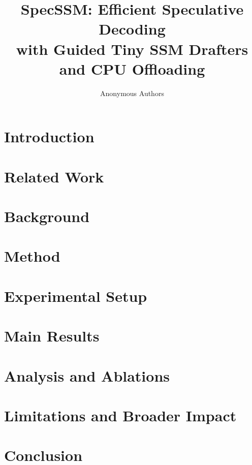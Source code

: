 \documentclass{article}
\title{SpecSSM: Efficient Speculative Decoding\\with Guided Tiny SSM Drafters and CPU Offloading}
\author{Anonymous Authors}
\begin{document}
\maketitle

\begin{abstract}

\end{abstract}

\section{Introduction}
\label{sec:intro}


\section{Related Work}
\label{sec:related}


\section{Background}
\label{sec:background}


\section{Method}
\label{sec:method}


\section{Experimental Setup}
\label{sec:setup}


\section{Main Results}
\label{sec:results_main}


\section{Analysis and Ablations}
\label{sec:analysis}


\section{Limitations and Broader Impact}
\label{sec:limitations}


\section{Conclusion}
\label{sec:conclusion}





\clearpage
\appendix


\clearpage

\end{document}
